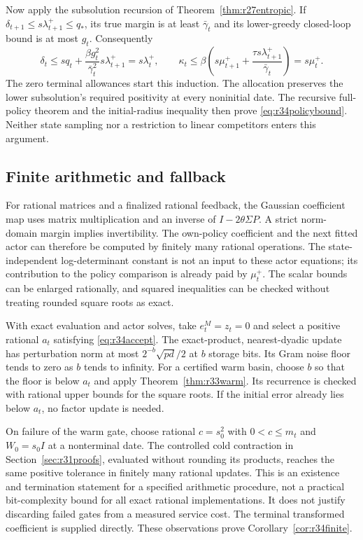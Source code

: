 \documentclass[ecta,nameyear,draft]{econsocart}
\theoremstyle{definition}
\theoremstyle{remark}
\begin{document}
Now apply the subsolution recursion of
Theorem~\ref{thm:r27entropic}. If
$\delta_{t+1}\leq s\lambda_{t+1}^+\leq q_*$, its true margin is at least
$\bar\gamma_t$ and its lower-greedy closed-loop bound is at most $g_t$.
Consequently
\[
 \delta_t\leq s q_t+
       \frac{\beta g_t^2}{\bar\gamma_t^2}s\lambda_{t+1}^+
           =s\lambda_t^+,
 \qquad
 \kappa_t\leq\beta\left(s\mu_{t+1}^+
       +\frac{\tau s\lambda_{t+1}^+}{\bar\gamma_t}\right)=s\mu_t^+.
\]
The zero terminal allowances start this induction. The allocation preserves
the lower subsolution's required positivity at every noninitial date.
The recursive full-policy theorem and the initial-radius inequality then
prove \eqref{eq:r34policybound}. Neither state sampling nor a restriction to
linear competitors enters this argument.

\subsection{Finite arithmetic and fallback}
For rational matrices and a finalized rational feedback, the Gaussian
coefficient map uses matrix multiplication and an inverse of
$I-2\theta\Sigma P$. A strict norm-domain margin implies invertibility.
The own-policy coefficient and the next fitted actor can therefore be
computed by finitely many rational operations. The state-independent
log-determinant constant is not an input to these actor equations; its
contribution to the policy comparison is already paid by $\mu_t^+$.
The scalar bounds can be enlarged rationally, and squared inequalities can
be checked without treating rounded square roots as exact.

With exact evaluation and actor solves, take $e_t^M=z_t=0$ and select a
positive rational $a_t$ satisfying \eqref{eq:r34accept}. The exact-product,
nearest-dyadic update has perturbation norm at most
$2^{-b}\sqrt{pd}/2$ at $b$ storage bits. Its Gram noise floor tends to zero
as $b$ tends to infinity. For a certified warm basin, choose $b$ so that the
floor is below $a_t$ and apply Theorem~\ref{thm:r33warm}. Its recurrence is
checked with rational upper bounds for the square roots. If the initial
error already lies below $a_t$, no factor update is needed.

On failure of the warm gate, choose rational $c=s_0^2$ with $0<c\leq m_t$
and $W_0=s_0I$ at a nonterminal date. The controlled cold contraction in
Section~\ref{sec:r31proofs}, evaluated without rounding its products, reaches
the same positive tolerance in finitely many rational updates. This is an
existence and termination statement for a specified arithmetic procedure,
not a practical bit-complexity bound for all exact rational implementations.
It does not justify discarding failed gates from a measured service cost.
The terminal transformed coefficient is supplied directly. These observations
prove Corollary~\ref{cor:r34finite}.
\end{document}
